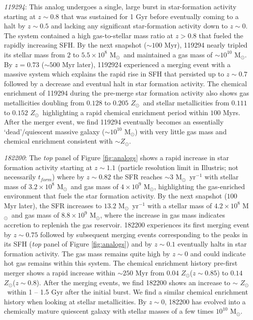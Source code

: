 \documentclass[twocolumn,tight,times,linenumbers]{aastex631}
\newcommand{\msol}{M$_\odot$}
\newcommand{\zsol}{$Z_\odot$}
\begin{document}
		
		\textit{119294}: This analog undergoes a single, large burst in star-formation activity starting at $z \sim 0.8$ that was sustained for 1 Gyr before eventually coming to a halt by $z \sim 0.5$ and lacking any significant star-formation activity down to $z \sim 0$. The system contained a high gas-to-stellar mass ratio at $z > 0.8$ that fueled the rapidly increasing SFH. By the next snapshot ($\sim 100$ Myr), 119294 nearly tripled its stellar mass from $2$ to $5.5 \times 10^8$ \msol~and maintained a gas mass of $\sim 10^{10}$ \msol. By $z = 0.73$ ($\sim 500$ Myr later), 1192924 experienced a merging event with a massive system which explains the rapid rise in SFH that persisted up to $z\sim 0.7$ followed by a decrease and eventual halt in star formation activity. The chemical enrichment of 119294 during the pre-merge star formation activity also shows gas metallicities doubling from $0.128$ to $0.205$ \zsol~and stellar metallicities from $0.111$ to $0.152$ \zsol~highlighting a rapid chemical enrichment period within $100$ Myrs. After the merger event, we find 119294 eventually becomes an essentially `dead'/quiescent massive galaxy ($\sim 10^{10}$ \msol) with very little gas mass and chemical enrichment consistent with $\sim \textrm{\zsol}$.
		
		\textit{182200}: The \textit{top} panel of Figure \ref{fig:analogs} shows a rapid increase in star formation activity starting at $z \sim 1.1$ (particle resolution limit in Illustris; not necessarily $t_{form}$) where by $z \sim 0.82$ the SFR reaches $\sim 3$ \msol~yr$^{-1}$ with stellar mass of $3.2\times10^8$ \msol~and gas mass of $4 \times 10^9$ \msol, highlighting the gas-enriched environment that fuels the star formation activity. By the next snapshot ($100$ Myr later), the SFR increases to $13.2$ \msol~yr$^{-1}$ with a stellar mass of $4.2\times10^8$ \msol~and gas mass of $8.8\times10^9$ \msol, where the increase in gas mass indicates accretion to replenish the gas reservoir. 182200 experiences its first merging event by $z \sim 0.75$ followed by subsequent merging events corresponding to the peaks in its SFH (\textit{top} panel of Figure \ref{fig:analogs}) and by $z \sim 0.1$ eventually halts in star formation activity. The gas mass remains quite high by $z \sim 0$ and could indicate hot gas remains within this system. The chemical enrichment history pre-first merger shows a rapid increase within $\sim 250$ Myr from $0.04$ \zsol ($z \sim 0.85$) to $0.14$ \zsol ($z \sim 0.8$). After the merging events, we find 182200 shows an increase to $\sim$ \zsol~within 1 -- 1.5 Gyr after the initial burst. We find a similar chemical enrichment history when looking at stellar metallicities. By $z \sim 0$, 182200 has evolved into a chemically mature quiescent galaxy with stellar masses of a few times $10^{10}$ \msol. 
		
\end{document}
